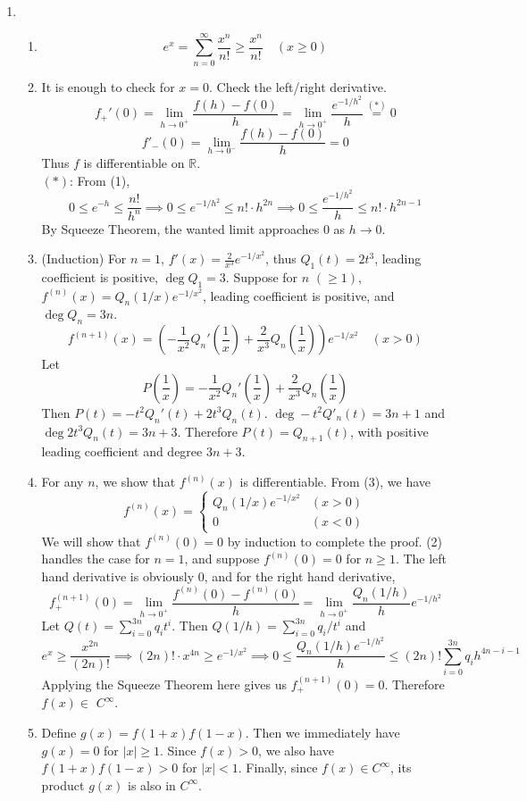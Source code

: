 \documentclass[11pt]{report}
\newcommand{\ra}{\rightarrow}
\newcommand{\abs}[1]{\left|#1\right|}
\newcommand{\imp}{\implies}
\newcommand{\R}{\mathbb{R}}
\begin{document}
\begin{enumerate}
\item
\begin{enumerate}
	\item $$e^x = \sum_{n=0}^\infty \frac{x^n}{n!} \geq \frac{x^n}{n!} \quad (x \geq 0)$$
	\item It is enough to check for $x= 0$. Check the left/right derivative.
	$$f_+'(0) = \lim_{h\ra0^+} \frac{f(h) - f(0)}{h} = \lim_{h\ra0^+} \frac{e^{-1/h^2}}{h} \overset{(*)}{=} 0$$
	$$f'_-(0) = \lim_{h\ra0^-}\frac{f(h)-f(0)}{h} = 0$$
	Thus $f$ is differentiable on $\R$.\\
	$(*)$: From (1), $$0\leq e^{-h} \leq \frac{n!}{h^n} \imp 0\leq e^{-1/h^2} \leq n!\cdot h^{2n} \imp 0\leq \frac{e^{-1/h^2}}{h} \leq n!\cdot h^{2n-1}$$
	By Squeeze Theorem, the wanted limit approaches 0 as $h\ra 0$.
	\item (Induction) For $n =1$, $f'(x) = \frac{2}{x^3}e^{-1/x^2}$, thus $Q_1(t) = 2t^3$, leading coefficient is positive, $\deg Q_1 = 3$.
	Suppose for $n$ $(\geq 1)$, $f^{(n)}(x) = Q_n(1/x)e^{-1/x^2}$, leading coefficient is positive, and $\deg Q_n = 3n$.
	$$f^{(n+1)}(x) = \left(-\frac{1}{x^2} Q_n'\left(\frac{1}{x}\right) +\frac{2}{x^3} Q_n\left(\frac{1}{x}\right)\right)e^{-1/x^2} \quad (x>0)$$
	Let $$P\left(\frac{1}{x}\right) = -\frac{1}{x^2} Q_n'\left(\frac{1}{x}\right) +\frac{2}{x^3} Q_n\left(\frac{1}{x}\right)$$
	Then $P(t) = -t^2 Q_n'(t) + 2t^3 Q_n(t)$. $\deg -t^2 Q'_n(t) = 3n+1$ and $\deg 2t^3 Q_n(t) = 3n+3$. Therefore $P(t) = Q_{n+1}(t)$, with positive leading coefficient and degree $3n+3$.
	\item For any $n$, we show that $f^{(n)}(x)$ is differentiable. From (3), we have
	$$f^{(n)}(x) = \begin{cases}
		Q_n(1/x)e^{-1/x^2} & (x > 0) \\ 0 & ( x < 0)
	\end{cases}$$
	We will show that $f^{(n)}(0) = 0$ by induction to complete the proof. (2) handles the case for $n=1$, and suppose $f^{(n)}(0) = 0$ for $n \geq 1$. The left hand derivative is obviously 0, and for the right hand derivative,
	$$f_+^{(n+1)}(0) = \lim_{h\ra0^+} \frac{f^{(n)}(0) - f^{(n)}(0)}{h} = \lim_{h\ra0^+} \frac{Q_n(1/h)}{h}e^{-1/h^2}$$
	Let $Q(t) = \sum_{i=0}^{3n} q_i t^i$. Then $Q(1/h) = \sum_{i=0}^{3n} q_i/t^i$ and
	$$e^{x} \geq \frac{x^{2n}}{(2n)!} \imp (2n)!\cdot x^{4n} \geq e^{-1/x^2}
	\imp 0 \leq \frac{Q_n(1/h)e^{-1/h^2}}{h} \leq (2n)! \sum_{i=0}^{3n} q_i h^{4n-i-1}$$
	Applying the Squeeze Theorem here gives us $f_+^{(n+1)}(0) =0$. Therefore $f(x) \in$ $C^\infty$.
	\item Define $g(x) = f(1+x)f(1-x)$. Then we immediately have $g(x) = 0$ for $\abs{x}\geq 1$. Since $f(x) > 0$, we also have $f(1+x)f(1-x) > 0$ for $\abs{x} < 1$. Finally, since $f(x)\in C^\infty$, its product $g(x)$ is also in $C^\infty$.
\end{enumerate}


\end{enumerate}
\end{document}
